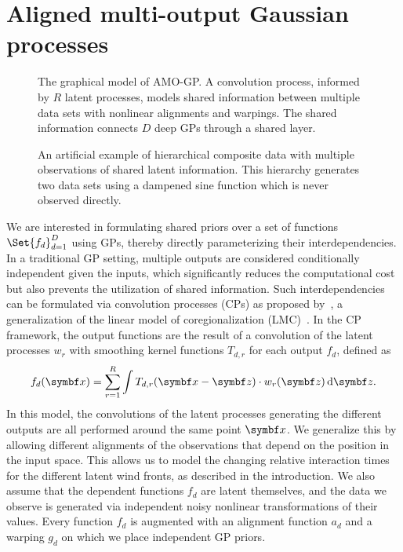 \section{Aligned multi-output Gaussian processes}
\label{toc:alignment:model}
\begin{figure}[t]
    \centering
    
    \caption[Graphical model: Aligned multi-output GP]{
        \label{fig:alignment:graphical_model_supervised}
        The graphical model of AMO-GP.
        A convolution process, informed by $R$ latent processes, models shared information between multiple data sets with nonlinear alignments and warpings.
        The shared information connects $D$ deep GPs through a shared layer.
    }
\end{figure}
\begin{figure}[t]
    \centering
    \caption[Artificial composite data]{
        \label{fig:alignment:dampened_sine_decomposition}
        An artificial example of hierarchical composite data with multiple observations of shared latent information.
        This hierarchy generates two data sets using a dampened sine function which is never observed directly.
    }
\end{figure}
We are interested in formulating shared priors over a set of functions $\Set{f_d}_{d=1}^D$ using GPs, thereby directly parameterizing their interdependencies.
In a traditional GP setting, multiple outputs are considered conditionally independent given the inputs, which significantly reduces the computational cost but also prevents the utilization of shared information.
Such interdependencies can be formulated via convolution processes (CPs) as proposed by~\textcite{boyle_dependent_2004,alvarez_sparse_2009,alvarez_efficient_2010}, a generalization of the linear model of coregionalization (LMC)~\parencite{journel_mining_1978,coburn_geostatistics_2000}.
In the CP framework, the output functions are the result of a convolution of the latent processes $w_r$ with smoothing kernel functions $T_{d,r}$ for each output $f_d$, defined as
\begin{align}
    f_d(\mat{x}) = \sum_{r=1}^R \int T_{d,r}(\mat{x} - \mat{z}) \cdot w_r(\mat{z}) \diff \mat{z}.
\end{align}
In this model, the convolutions of the latent processes generating the different outputs are all performed around the same point $\mat{x}$.
We generalize this by allowing different alignments of the observations that depend on the position in the input space.
This allows us to model the changing relative interaction times for the different latent wind fronts, as described in the introduction.
We also assume that the dependent functions $f_d$ are latent themselves, and the data we observe is generated via independent noisy nonlinear transformations of their values.
Every function $f_d$ is augmented with an alignment function $a_d$ and a warping $g_d$ on which we place independent GP priors.

